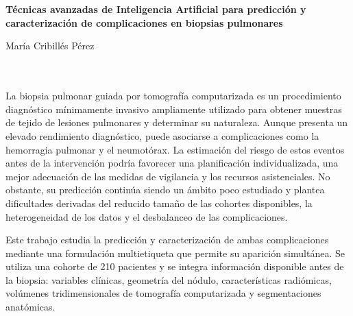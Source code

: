 \chapter*{}






\cleardoublepage
\thispagestyle{empty}

\begin{center}
{\large\bfseries Técnicas avanzadas de Inteligencia Artificial para predicción y caracterización de complicaciones en biopsias pulmonares}\\
\end{center}
\begin{center}
María Cribillés Pérez\\
\end{center}

\\

\vspace{0.7cm}
\\

La biopsia pulmonar guiada por tomografía computarizada es un procedimiento diagnóstico mínimamente invasivo ampliamente utilizado para obtener muestras de tejido de lesiones pulmonares y determinar su naturaleza. Aunque presenta un elevado rendimiento diagnóstico, puede asociarse a complicaciones como la hemorragia pulmonar y el neumotórax. La estimación del riesgo de estos eventos antes de la intervención podría favorecer una planificación individualizada, una mejor adecuación de las medidas de vigilancia y los recursos asistenciales. No obstante, su predicción continúa siendo un ámbito poco estudiado y plantea dificultades derivadas del reducido tamaño de las cohortes disponibles, la heterogeneidad de los datos y el desbalanceo de las complicaciones.

Este trabajo estudia la predicción y caracterización de ambas complicaciones mediante una formulación multietiqueta que permite su aparición simultánea. Se utiliza una cohorte de 210 pacientes y se integra información disponible antes de la biopsia: variables clínicas, geometría del nódulo, características radiómicas, volúmenes tridimensionales de tomografía computarizada y segmentaciones anatómicas.


